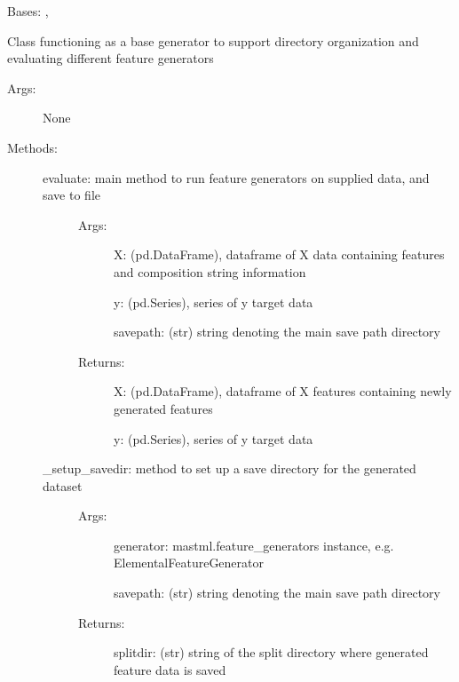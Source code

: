 \documentclass[letterpaper,10pt,english]{sphinxmanual}
\begin{document}
\begin{fulllineitems}
\label{\detokenize{api/mastml.feature_generators.BaseGenerator:mastml.feature_generators.BaseGenerator}}
Bases: , 

Class functioning as a base generator to support directory organization and evaluating different feature generators
\begin{description}
\item[{Args:}] \leavevmode
None

\item[{Methods:}] \leavevmode\begin{description}
\item[{evaluate: main method to run feature generators on supplied data, and save to file}] \leavevmode\begin{description}
\item[{Args:}] \leavevmode
X: (pd.DataFrame), dataframe of X data containing features and composition string information

y: (pd.Series), series of y target data

savepath: (str) string denoting the main save path directory

\item[{Returns:}] \leavevmode
X: (pd.DataFrame), dataframe of X features containing newly generated features

y: (pd.Series), series of y target data

\end{description}

\item[{\_setup\_savedir: method to set up a save directory for the generated dataset}] \leavevmode\begin{description}
\item[{Args:}] \leavevmode
generator: mastml.feature\_generators instance, e.g. ElementalFeatureGenerator

savepath: (str) string denoting the main save path directory

\item[{Returns:}] \leavevmode
splitdir: (str) string of the split directory where generated feature data is saved

\end{description}


\end{description}
\end{description}
\end{fulllineitems}
\end{document}
